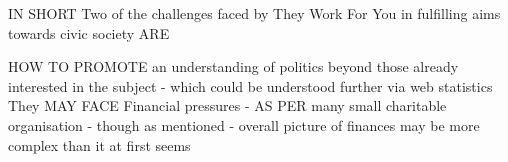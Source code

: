 IN SHORT
		Two of the challenges faced by They Work For You in fulfilling aims towards civic society ARE
 
			HOW TO PROMOTE an understanding of politics beyond those already interested in the subject
				- which could be understood further via web statistics
			They MAY FACE Financial pressures - AS PER many small charitable organisation 
				- though as mentioned 
				- overall picture of finances may be more complex than it at first seems
